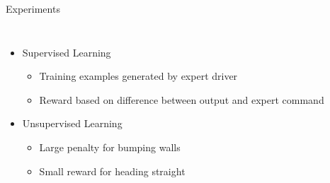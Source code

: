 \documentclass{beamer}
\begin{document}
	\begin{frame}{Experiments}

		\begin{columns}[c c]
		

				\begin{itemize}
	
					
					\item Supervised Learning
						\begin{itemize}
						\item Training examples generated by expert driver
						\item Reward based on difference between output and expert command
						\end{itemize}
	
					\item Unsupervised Learning
						\begin{itemize}
						\item Large penalty for bumping walls
						\item Small reward for heading straight
						\end{itemize}
							
				\end{itemize}


				\vspace{-0.5cm}
				

\end{columns}
\end{frame}
\end{document}
